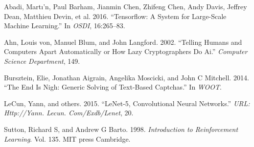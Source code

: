 \documentclass[]{elsarticle} %
\begin{document}
\hypertarget{refs}{}
\leavevmode\hypertarget{ref-abadi2016tensorflow}{}%
Abadi, Martı'n, Paul Barham, Jianmin Chen, Zhifeng Chen, Andy Davis, Jeffrey Dean, Matthieu Devin, et al. 2016. ``Tensorflow: A System for Large-Scale Machine Learning.'' In \emph{OSDI}, 16:265--83.

\leavevmode\hypertarget{ref-von2002telling}{}%
Ahn, Louis von, Manuel Blum, and John Langford. 2002. ``Telling Humans and Computers Apart Automatically or How Lazy Cryptographers Do Ai.'' \emph{Computer Science Department}, 149.

\leavevmode\hypertarget{ref-bursztein2014end}{}%
Bursztein, Elie, Jonathan Aigrain, Angelika Moscicki, and John C Mitchell. 2014. ``The End Is Nigh: Generic Solving of Text-Based Captchas.'' In \emph{WOOT}.

\leavevmode\hypertarget{ref-lecun2015lenet}{}%
LeCun, Yann, and others. 2015. ``LeNet-5, Convolutional Neural Networks.'' \emph{URL: Http://Yann. Lecun. Com/Exdb/Lenet}, 20.

\leavevmode\hypertarget{ref-sutton1998introduction}{}%
Sutton, Richard S, and Andrew G Barto. 1998. \emph{Introduction to Reinforcement Learning}. Vol. 135. MIT press Cambridge.
\end{document}

